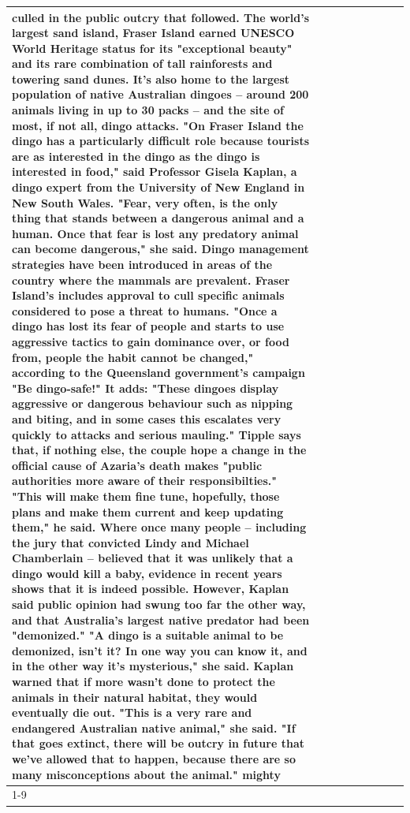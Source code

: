 \begin{table}[H]
\begin{tabular}{lllrlllll}
culled in the public outcry that followed. The world's largest sand island, Fraser Island earned UNESCO World Heritage status for its "exceptional beauty" and its rare combination of tall rainforests and towering sand dunes. It's also home to the largest population of native Australian dingoes -- around 200 animals living in up to 30 packs -- and the site of most, if not all, dingo attacks. "On Fraser Island the dingo has a particularly difficult role because tourists are as interested in the dingo as the dingo is interested in food," said Professor Gisela Kaplan, a dingo expert from the University of New England in New South Wales. "Fear, very often, is the only thing that stands between a dangerous animal and a human. Once that fear is lost any predatory animal can become dangerous," she said. Dingo management strategies have been introduced in areas of the country where the mammals are prevalent. Fraser Island's includes approval to cull specific animals considered to pose a threat to humans. "Once a dingo has lost its fear of people and starts to use aggressive tactics to gain dominance over, or food from, people the habit cannot be changed," according to the Queensland government's campaign "Be dingo-safe!" It adds: "These dingoes display aggressive or dangerous behaviour such as nipping and biting, and in some cases this escalates very quickly to attacks and serious mauling." Tipple says that, if nothing else, the couple hope a change in the official cause of Azaria's death makes "public authorities more aware of their responsibilties." "This will make them fine tune, hopefully, those plans and make them current and keep updating them," he said. Where once many people -- including the jury that convicted Lindy and Michael Chamberlain -- believed that it was unlikely that a dingo would kill a baby, evidence in recent years shows that it is indeed possible. However, Kaplan said public opinion had swung too far the other way, and that Australia's largest native predator had been "demonized." "A dingo is a suitable animal to be demonized, isn't it? In one way you can know it, and in the other way it's mysterious," she said. Kaplan warned that if more wasn't done to protect the animals in their natural habitat, they would eventually die out. "This is a very rare and endangered Australian native animal," she said. "If that goes extinct, there will be outcry in future that we've allowed that to happen, because there are so many misconceptions about the animal." mighty \\
\cline{1-9}
\bottomrule
\end{tabular}
\end{table}
